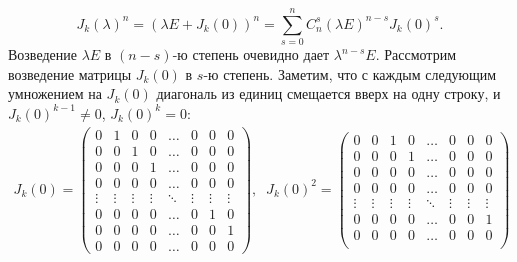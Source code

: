 \begin{algorithm}
    $$J_k(\lambda)^n = (\lambda E + J_k(0))^n = \displaystyle\sum_{s = 0}^{n} C_n^s 
    (\lambda E)^{n-s} J_k(0)^s.$$
    Возведение $\lambda E$ в $(n-s)$-ю степень очевидно дает $\lambda^{n-s} E$. Рассмотрим 
    возведение матрицы $J_k(0)$ в $s$-ю степень. Заметим, что с каждым следующим умножением на 
    $J_k(0)$ диагональ из единиц смещается вверх на одну строку, и $J_k(0)^{k-1} \neq 0$, 
    $J_k(0)^k = 0$:
    \begin{eqnarray*}
        J_k(0) = \begin{pmatrix}
            0       & 1       & 0       & 0       & \dots  & 0       & 0       & 0          \\
            0       & 0       & 1       & 0       & \dots  & 0       & 0       & 0          \\
            0       & 0       & 0       & 1       & \dots  & 0       & 0       & 0          \\
            0       & 0       & 0       & 0       & \dots  & 0       & 0       & 0          \\
            \vdots  & \vdots  & \vdots  & \vdots  & \ddots & \vdots  & \vdots  & \vdots     \\
            0       & 0       & 0       & 0       & \dots  & 0       & 1       & 0          \\
            0       & 0       & 0       & 0       & \dots  & 0       & 0       & 1          \\
            0       & 0       & 0       & 0       & \dots  & 0       & 0       & 0
        \end{pmatrix}, \; \;  J_k(0)^2 = \begin{pmatrix}
            0       & 0       & 1       & 0       & \dots  & 0       & 0       & 0          \\
            0       & 0       & 0       & 1       & \dots  & 0       & 0       & 0          \\
            0       & 0       & 0       & 0       & \dots  & 0       & 0       & 0          \\
            0       & 0       & 0       & 0       & \dots  & 0       & 0       & 0          \\
            \vdots  & \vdots  & \vdots  & \vdots  & \ddots & \vdots  & \vdots  & \vdots     \\
            0       & 0       & 0       & 0       & \dots  & 0       & 0       & 1          \\
            0       & 0       & 0       & 0       & \dots  & 0       & 0       & 0          \\

\end{pmatrix}
\end{eqnarray*}
\end{algorithm}

